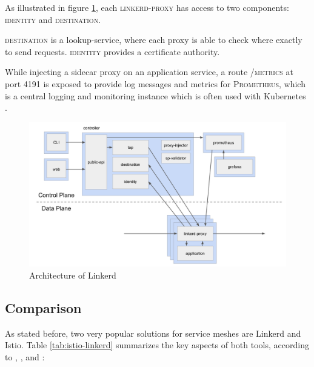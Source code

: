 As illustrated in figure \ref{fig:arch-linkerd}, each \textsc{linkerd-proxy} has access to two components: \textsc{identity} and \textsc{destination}.

\textsc{destination} is a lookup-service, where each proxy is able to check where exactly to send requests. \textsc{identity} provides a certificate authority.

While injecting a sidecar proxy on an application service, a route \textsc{/metrics} at port 4191 is exposed to provide log messages and metrics for \textsc{Prometheus}, which is a central logging and monitoring instance which is often used with Kubernetes \cite{linkerd-docs-arch}.

\begin{figure}
    \includegraphics[width=\columnwidth]{img/linkerd_architecture.png}
    \caption{Architecture of Linkerd \cite{linkerd-docs-arch}}
    \label{fig:arch-linkerd}
\end{figure}

\subsection{Comparison}

As stated before, two very popular solutions for service meshes are Linkerd and Istio. Table \ref{tab:istio-linkerd} summarizes the key aspects of both tools, according to \cite{linkerd-github}, \cite{istio-github}, \cite{istio-linkerd-compare-1} and \cite{istio-linkerd-compare-2}:

